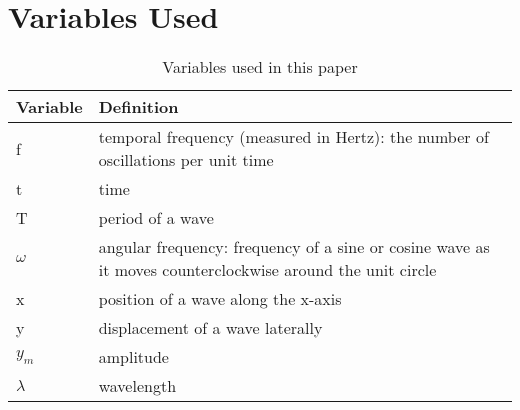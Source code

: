 \chapter{Variables Used}\label{appendix:global-variables}
\begin{table}
	\begin{tabular}{|p{20em} | p{25em}|}
		\hline
		Variable & Definition \\
		\hline
		f & temporal frequency (measured in Hertz): the number of oscillations per unit time \\
		t & time \\
		T & period of a wave \\
		$\omega$ & angular frequency: frequency of a sine or cosine wave as it moves counterclockwise around the unit circle \\
		x & position of a wave along the x-axis \\
		y & displacement of a wave laterally \\
		$y_m$ & amplitude \\
		$\lambda$ & wavelength \\
		\hline
	\end{tabular}
\caption{Variables used in this paper}
\label{tbl:global-variables}
\end{table}